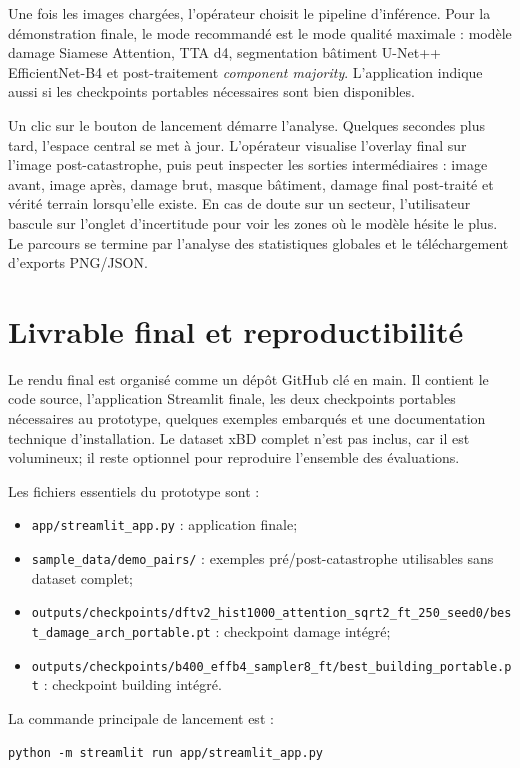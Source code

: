 \documentclass[french,12pt]{article}
\begin{document}
Une fois les images chargées, l'opérateur choisit le pipeline d'inférence. Pour la démonstration finale, le mode recommandé est le mode qualité maximale : modèle damage Siamese Attention, TTA d4, segmentation bâtiment U-Net++ EfficientNet-B4 et post-traitement \textit{component majority}. L'application indique aussi si les checkpoints portables nécessaires sont bien disponibles.

Un clic sur le bouton de lancement démarre l'analyse. Quelques secondes plus tard, l'espace central se met à jour. L'opérateur visualise l'overlay final sur l'image post-catastrophe, puis peut inspecter les sorties intermédiaires : image avant, image après, damage brut, masque bâtiment, damage final post-traité et vérité terrain lorsqu'elle existe. En cas de doute sur un secteur, l'utilisateur bascule sur l'onglet d'incertitude pour voir les zones où le modèle hésite le plus. Le parcours se termine par l'analyse des statistiques globales et le téléchargement d'exports PNG/JSON.

\section{Livrable final et reproductibilité}

Le rendu final est organisé comme un dépôt GitHub clé en main. Il contient le code source, l'application Streamlit finale, les deux checkpoints portables nécessaires au prototype, quelques exemples embarqués et une documentation technique d'installation. Le dataset xBD complet n'est pas inclus, car il est volumineux; il reste optionnel pour reproduire l'ensemble des évaluations.

Les fichiers essentiels du prototype sont :
\begin{itemize}
    \item \texttt{app/streamlit\_app.py} : application finale;
    \item \texttt{sample\_data/demo\_pairs/} : exemples pré/post-catastrophe utilisables sans dataset complet;
    \item \texttt{outputs/checkpoints/dftv2\_hist1000\_attention\_sqrt2\_ft\_250\_seed0/best\_damage\_arch\_portable.pt} : checkpoint damage intégré;
    \item \texttt{outputs/checkpoints/b400\_effb4\_sampler8\_ft/best\_building\_portable.pt} : checkpoint building intégré.
\end{itemize}

La commande principale de lancement est :
\begin{lstlisting}
python -m streamlit run app/streamlit_app.py
\end{lstlisting}
\end{document}
